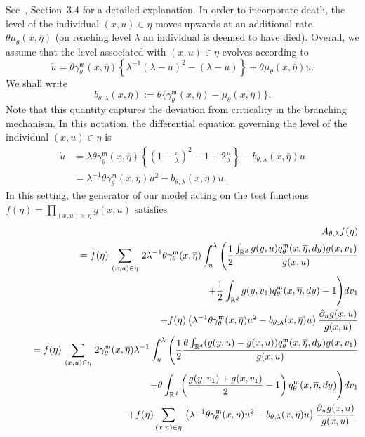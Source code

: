\documentclass[12pt]{article}
\def \non{{\nonumber}}
\def \bar{\overline}
\begin{document}
See~\cite{etheridge/kurtz:2018}, Section~3.4 for a detailed explanation.
In order to incorporate death, the level of the individual $(x,u)\in \eta$ 
moves upwards at an additional 
rate $\theta \mu_\theta(x,\overline{\eta})$ (on reaching level $\lambda$ an
individual is deemed to
have died). Overall, we assume that the level associated with $(x,u)\in\eta$
evolves according to
$$\dot{u}= \theta \gamma^{\mathfrak{m}}_{\theta}(x, \overline{\eta}) 
\left\{\lambda^{-1}(\lambda -u)^{2}
-(\lambda -u)\right\}+\theta \mu_\theta(x,\overline{\eta})u.$$
We shall write 
$$b_{\theta, \lambda}(x,\overline{\eta}):=\theta\big\{\gamma^{\mathfrak{m}}_{\theta}(x,\overline{\eta})
-\mu_\theta(x,\overline{\eta})\big\}.$$
Note that this quantity captures the deviation from criticality in the branching
mechanism. In this notation, the differential equation governing the level of the
individual $(x,u)\in\eta$ is
\begin{align}
\dot{u}&=\lambda \theta \gamma^{\mathfrak{m}}_{\theta}(x,\overline{\eta}) 
\left\{\left(1-\frac{u}{\lambda}\right)^{2}
-1 +2\frac{u}{\lambda}\right\} -b_{\theta, \lambda}(x,\overline{\eta})u \nonumber \\
&=\lambda^{-1} \theta \gamma^{\mathfrak{m}}_{\theta}(x,\overline{\eta}) u^2 -b_{\theta, \lambda}(x,\overline{\eta})u. \label{differential equation for level}
\end{align}
In this setting, the generator of our model acting on the test functions $f(\eta)=\prod_{(x,u) \in \eta}g(x,u)$ satisfies
\begin{eqnarray}\label{Generator of prelimit simplest model}
&&A_{\theta, \lambda}f(\eta ) \nonumber \\
&&\quad =f(\eta )\,\sum_{(x,u)\in\eta}\,2\lambda^{-1}\theta \gamma^{\mathfrak{m}}_{\theta}(x, \overline{\eta})
\int_u^{
\lambda}\Bigg(\frac 12\frac {\int_{\mathbb{R}^d}g(y,u)q^{\mathfrak{m}}_\theta(x,\overline{\eta },d
y)g(x,v_1)}{g(x,u)} \label{multgen3}\\
&&\qquad\qquad\qquad\qquad\qquad\qquad\qquad\qquad\qquad\qquad
+\frac 12\int_{\mathbb{R}^d}g(y,v_1)q^{\mathfrak{m}}_\theta(x,\overline{\eta} ,dy)-
1\Bigg)dv_1\nonumber\\
&&\quad \quad +f(\eta )\left(\lambda^{-1} \theta \gamma^{\mathfrak{m}}_{\theta}(x,\overline{\eta}) u^2 -b_{\theta, \lambda}(x,\overline{\eta})u\right)\frac {\partial_u g(x,u)}{g(x,u)}\nonumber\\
&&\quad =f(\eta )\,\sum_{(x,u)\in\eta}\,2 \gamma^{\mathfrak{m}}_{\theta}(x, \overline{\eta})\lambda^{-1}\int_u^{
\lambda}\Bigg(\frac 12\frac {\theta\int_{\mathbb{R}^d}(g(y,u)-g(x,u))q^{\mathfrak{m}}_\theta(x,\bar{
\eta },dy)g(x,v_1)}{g(x,u)}\non\\
&&\qquad\qquad\qquad\qquad\qquad\qquad\qquad +\theta\int_{\mathbb{R}^d}\left(\frac{g(y,v_1)+g(x,v_1)}{2}-1\right)q^{\mathfrak{m}}_\theta(x,\overline{\eta },dy)\Bigg)dv_1\nonumber\\
&&\qquad\qquad
+f(\eta )\sum_{(x,u)\in\eta}\,\left(\lambda^{-1} \theta \gamma^{\mathfrak{m}}_{\theta}(x,\overline{\eta}) u^2 -b_{\theta, \lambda}(x,\overline{\eta})u\right)\frac {\partial_u g(x,u)}{g(x,u)}.\nonumber
\end{eqnarray}
\end{document}
